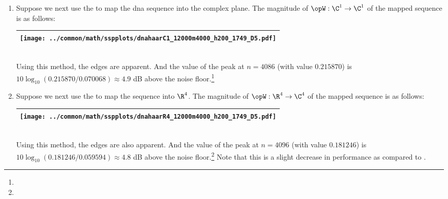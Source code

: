\begin{example}
\begin{enumerate}
  \item \label{item:dna_haar_C1}
    Suppose we next use the   to map
    the dna sequence into the complex plane.
    The magnitude of $\opW:\C^1\to\C^1$ of the mapped sequence is as follows:
     \\\begin{tabular}{|>{\scs}c|}
          \hline
          \texttt{[image: ../common/math/sspplots/dnahaarC1\_12000m4000\_h200\_1749\_D5.pdf]}%
        \\\hline
     \end{tabular}\\
     Using this method, the edges are apparent.
     And the value of the peak at $n=4086$ (with value $0.215870$) is 
     $10\log_{10}(0.215870/0.070068)\approx 4.9$ dB above the noise floor.\footnote{}


  \item \label{item:dna_haar_R4}
    Suppose we next use the   to map
    the sequence into $\R^4$.
    The magnitude of $\opW:\R^4\to\C^4$ of the mapped sequence is as follows:
     \\\begin{tabular}{|>{\scs}c|}
          \hline
          \texttt{[image: ../common/math/sspplots/dnahaarR4\_12000m4000\_h200\_1749\_D5.pdf]}%
        \\\hline
     \end{tabular}\\
     Using this method, the edges are also apparent.
     And the value of the peak at $n=4096$ (with value $0.181246$) is 
     $10\log_{10}(0.181246/0.059594)\approx4.8$ dB
     above the noise floor.\footnote{}
     Note that this is a slight decrease in performance as compared to .


\end{enumerate}
\end{example}
